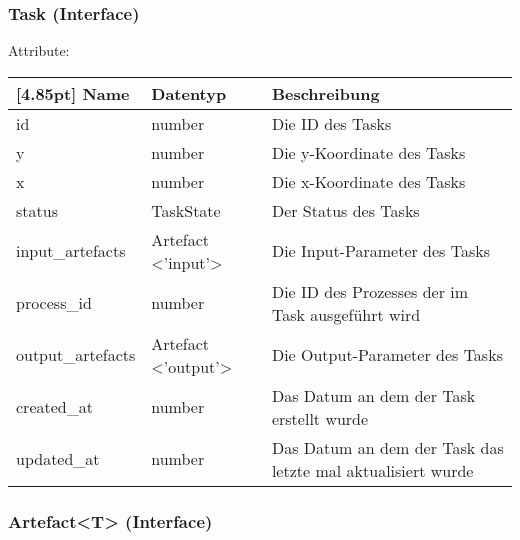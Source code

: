             \subsubsection{Task (Interface)}
            
            Attribute:
            \begin{center}
            	\renewcommand{\arraystretch}{1.5}
                \setlength\tabcolsep{5pt}
            	\begin{tabularx}{\textwidth}{|l|l|X|}
            		\hline
                    \rowcolor[gray]{0.75}[4.85pt]            		
                    Name & Datentyp & Beschreibung \\ \hline
                    id & number & Die ID des Tasks \\ \hline
                    y & number & Die y-Koordinate des Tasks\\ \hline
                    x & number & Die x-Koordinate des Tasks \\ \hline
                    status & TaskState & Der Status des Tasks \\ \hline
                    input_artefacts & Artefact <'input'> & Die Input-Parameter des Tasks \\ \hline
                    process_id & number & Die ID des Prozesses der im Task ausgeführt wird \\ \hline
                    output_artefacts & Artefact <'output'> & Die Output-Parameter des Tasks \\ \hline
                    created_at & number & Das Datum an dem der Task erstellt wurde \\ \hline
                    updated_at & number & Das Datum an dem der Task das letzte mal aktualisiert wurde \\ \hline
            	\end{tabularx}
            \end{center}
                
    		\subsubsection{Artefact<T> (Interface)}
    		

